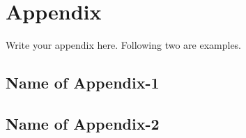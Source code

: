 \chapter{Appendix}

Write your appendix here. Following two are examples. 


\section{Name of Appendix-1}


\section{Name of Appendix-2}




